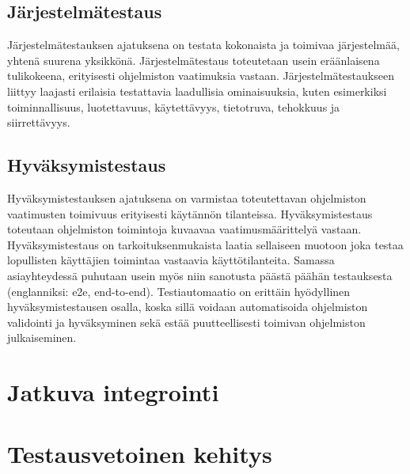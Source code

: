   \subsection{Järjestelmätestaus} \label{07_jarjestelmatestaus}

  Järjestelmätestauksen ajatuksena on testata kokonaista ja toimivaa järjestelmää, yhtenä suurena yksikkönä.
  Järjestelmätestaus toteutetaan usein eräänlaisena tulikokeena, erityisesti ohjelmiston vaatimuksia vastaan.
  Järjestelmätestaukseen liittyy laajasti erilaisia testattavia laadullisia ominaisuuksia, kuten esimerkiksi toiminnallisuus, luotettavuus, käytettävyys, tietotruva, tehokkuus ja siirrettävyys.

  \subsection{Hyväksymistestaus} \label{07_hyvaksymistestaus}

  Hyväksymistestauksen ajatuksena on varmistaa toteutettavan ohjelmiston vaatimusten toimivuus erityisesti käytännön tilanteissa.
  Hyväksymistestaus toteutaan ohjelmiston toimintoja kuvaavaa vaatimusmäärittelyä vastaan.
  Hyväksymistestaus on tarkoituksenmukaista laatia sellaiseen muotoon joka testaa lopullisten käyttäjien toimintaa vastaavia käyttötilanteita.
  Samassa asiayhteydessä puhutaan usein myös niin sanotusta päästä päähän testauksesta (englanniksi: e2e, end-to-end).
  Testiautomaatio on erittäin hyödyllinen hyväksymistestausen osalla, koska sillä voidaan automatisoida ohjelmiston validointi ja hyväksyminen sekä estää puutteellisesti toimivan ohjelmiston julkaiseminen.

\section{Jatkuva integrointi} \label{07_jatkuva_integrointi}


\section{Testausvetoinen kehitys} \label{07_testausvetoinen_kehitys}

